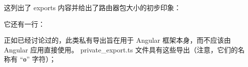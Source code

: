 这列出了 exports 内容并给出了路由器包大小的初步印象：




它还有一行：




正如已经讨论过的，此类私有导出旨在用于 Angular 框架本身，而不应该由 Angular 应用直接使用。
private\_export.ts 文件具有这些导出（注意，它们的名称有 “ɵ” 字符）；



